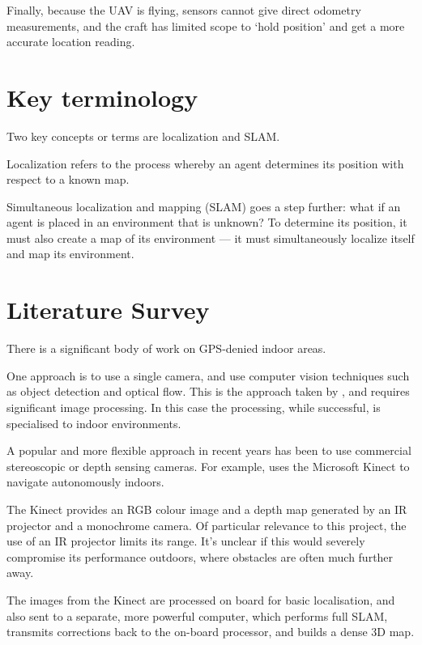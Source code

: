 \documentclass[12pt,oneside,a4paper]{book}
\begin{document}
Finally, because the UAV is flying, sensors cannot give direct
odometry measurements, and the craft has limited scope to `hold
position' and get a more accurate location reading.

\section{Key terminology}
\label{sec:key-terminology}

Two key concepts or terms are localization and SLAM.

Localization refers to the process whereby an agent
determines its position with respect to a known map.

Simultaneous localization and mapping (SLAM) goes a step further: what
if an agent is placed in an environment that is unknown? To determine
its position, it must also create a map of its environment --- it must
simultaneously localize itself and map its environment.

\section{Literature Survey}
\label{sec:litsurvey}

There is a significant body of work on GPS-denied indoor areas.

One approach is to use a single camera, and use computer vision
techniques such as object detection and optical flow. This is the
approach taken by \cite{5152680}, and requires significant image
processing. In this case the processing, while successful, is
specialised to indoor environments.

A popular and more flexible approach in recent years has been to use
commercial stereoscopic or depth sensing cameras. For example,
\cite{huang2011visual} uses the Microsoft Kinect to navigate
autonomously indoors.

The Kinect provides an RGB colour image and a depth map generated by
an IR projector and a monochrome camera. Of particular relevance to
this project, the use of an IR projector limits its range. It's
unclear if this would severely compromise its performance outdoors,
where obstacles are often much further away.

The images from the Kinect are processed on board for basic
localisation, and also sent to a separate, more powerful computer,
which performs full SLAM, transmits corrections back to the on-board
processor, and builds a dense 3D map.
\end{document}
